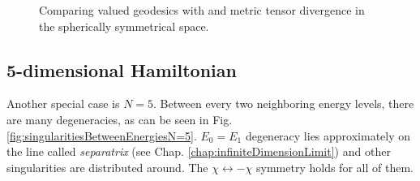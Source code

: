 \begin{figure}[H]
    \centering
    \caption{Comparing  valued geodesics with  and  metric tensor divergence in the spherically symmetrical space. }
    \label{fig:geodesicsinGR}
\end{figure}








\subsection{5-dimensional Hamiltonian}

Another special case is $N=5$. Between every two neighboring energy levels, there are many degeneracies, as can be seen in Fig. \ref{fig:singularitiesBetweenEnergiesN=5}. $E_0=E_1$ degeneracy lies approximately on the line called \emph{separatrix} (see Chap. \ref{chap:infiniteDimensionLimit}) and other singularities are distributed around. The $\chi\leftrightarrow-\chi$ symmetry holds for all of them.


